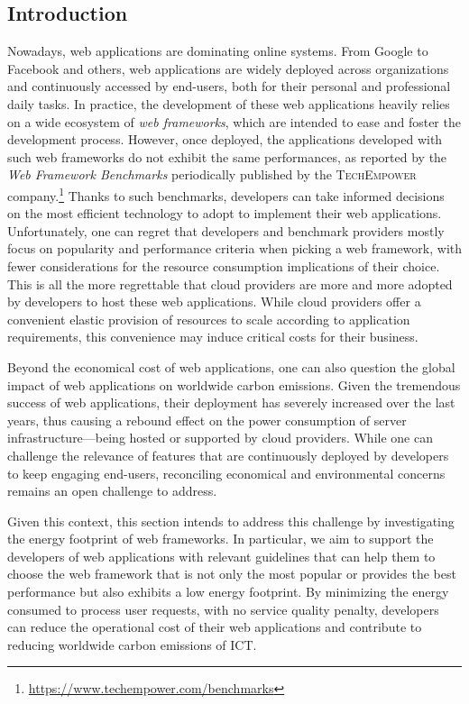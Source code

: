 \subsection{Introduction}
Nowadays, web applications are dominating online systems.
From Google to Facebook and others, web applications are widely deployed across organizations and continuously accessed by end-users, both for their personal and professional daily tasks.
In practice, the development of these web applications heavily relies on a wide ecosystem of \emph{web frameworks}, which are intended to ease and foster the development process.
However, once deployed, the applications developed with such web frameworks do not exhibit the same performances, as reported by the \emph{Web Framework Benchmarks} periodically published by the \textsc{TechEmpower} company.\footnote{\url{https://www.techempower.com/benchmarks}}
Thanks to such benchmarks, developers can take informed decisions on the most efficient technology to adopt to implement their web applications.
Unfortunately, one can regret that developers and benchmark providers mostly focus on popularity and performance criteria when picking a web framework, with fewer considerations for the resource consumption implications of their choice.
This is all the more regrettable that cloud providers are more and more adopted by developers to host these web applications.
While cloud providers offer a convenient elastic provision of resources to scale according to application requirements, this convenience may induce critical costs for their business.

Beyond the economical cost of web applications, one can also question the global impact of web applications on worldwide carbon emissions.
Given the tremendous success of web applications, their deployment has severely increased over the last years, thus causing a rebound effect on the power consumption of server infrastructure---being hosted or supported by cloud providers.
While one can challenge the relevance of features that are continuously deployed by developers to keep engaging end-users, reconciling economical and environmental concerns remains an open challenge to address.

Given this context, this section intends to address this challenge by investigating the energy footprint of web frameworks.
In particular, we aim to support the developers of web applications with relevant guidelines that can help them to choose the web framework that is not only the most popular or provides the best performance but also exhibits a low energy footprint.
By minimizing the energy consumed to process user requests, with no service quality penalty, developers can reduce the operational cost of their web applications and contribute to reducing worldwide carbon emissions of ICT.

